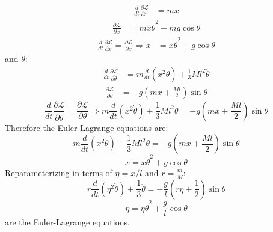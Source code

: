 \documentclass[9pt]{report}
\begin{document}
\begin{enumerate}
\[\begin{align}
\frac{d}{dt} \frac{\partial \mathcal{L}}{\partial\dot{x}} &= m \ddot{x}
\end{align}
\]
\[
\begin{align}
\frac{\partial \mathcal{L}}{\partial x} &= m x \dot{\theta}^2 + mg\cos\theta
\end{align}
\]
\[
\begin{align}
 \frac{d}{dt} \frac{\partial \mathcal{L}}{\partial\dot{x}} = \frac{\partial \mathcal{L}}{\partial x} \Rightarrow \ddot{x} &= x \dot{\theta}^2 + g \cos \theta
\end{align}
\]
and $\theta$:
\[
\begin{align}
\frac{d}{dt} \frac{\partial \mathcal{L}}{\partial\dot{\theta}} &= m \frac{d}{dt}(x^2\dot{\theta}) + \frac{1}{3} Ml^2 \ddot{\theta}
\end{align}
\]
\[
\begin{align}
\frac{\partial \mathcal{L}}{\partial \theta} &= -g (mx + \frac{Ml}{2}) \sin \theta
\end{align}
\]
\[
\frac{d}{dt} \frac{\partial \mathcal{L}}{\partial\dot{\theta}} = \frac{\partial \mathcal{L}}{\partial \theta} \Rightarrow m \frac{d}{dt}(x^2\dot{\theta}) + \frac{1}{3} Ml^2 \ddot{\theta}
= -g(mx + \frac{Ml}{2}) \sin \theta
\]
Therefore the Euler Lagrange equations are:
\[
m \frac{d}{dt}(x^2\dot{\theta}) + \frac{1}{3} Ml^2 \ddot{\theta} = -g (mx + \frac{Ml}{2}) \sin \theta \label{el_theta}
\]
\[
\ddot{x} = x \dot{\theta}^2 \label{el_x} + g \cos \theta
\]
Reparameterizing in terms of $\eta = x / l $ and $r=\frac{m}{M}$:
\begin{equation}
r \frac{d}{dt}(\eta^2\dot{\theta}) + \frac{1}{3}\ddot{\theta} = -\frac{g}{l} (r\eta + \frac{1}{2}) \sin \theta \label{el_eta}
\end{equation}
\begin{equation}
\ddot{\eta} = \eta \dot{\theta}^2 \label{el_theta} + \frac{g}{l}\cos \theta
\end{equation}
are the Euler-Lagrange equations.


\end{enumerate}
\end{document}
